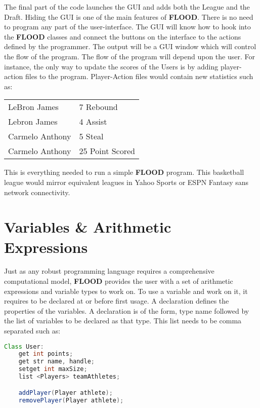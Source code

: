 \documentclass[12pt]{report}
\begin{document}
\begin{doublespace}
The final part of the code launches the GUI and adds both the League and the Draft. Hiding the GUI is one of the main features of \textbf{FLOOD}. There is no need to program any part of the user-interface. The GUI will know how to hook into the \textbf{FLOOD} classes and connect the buttons on the interface to the actions defined by the programmer. The output will be a GUI window which will control the flow of the program. The flow of the program will depend upon the user. For instance, the only way to update the scores of the Users is by adding player-action files to the program. Player-Action files would contain new statistics such as:
\begin{center}
\begin{tabular}{ l l }
LeBron James & 7 Rebound \\
Lebron James & 4 Assist \\
Carmelo Anthony & 5 Steal \\
Carmelo Anthony & 25 Point Scored
\end{tabular}
\end{center}
\end{doublespace}

\begin{doublespace}
This is everything needed to run a simple \textbf{FLOOD} program. This basketball league would mirror equivalent leagues in Yahoo Sports or ESPN Fantasy sans network connectivity.  
\end{doublespace}

\section{Variables \& Arithmetic Expressions}

\begin{doublespace}
Just as any robust programming language requires a comprehensive computational model, \textbf{FLOOD} provides the user with a set of arithmetic expressions and variable types to work on. To use a variable and work on it, it requires to be declared at or before first usage. A declaration defines the properties of the variables. A declaration is of the form, type name followed by the list of variables to be declared as that type. This list needs to be comma separated such as:
\end{doublespace}

\begin{lstlisting}[language=Java,label=some-code,caption=User.fld]
Class User:
	get int points;
	get str name, handle;
	setget int maxSize;
	list <Players> teamAthletes;

	addPlayer(Player athlete);
	removePlayer(Player athlete);
\end{lstlisting}
\end{document}
